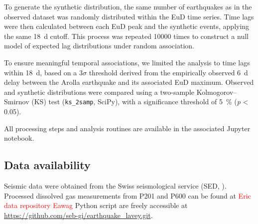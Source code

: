 To generate the synthetic distribution, the same number of earthquakes as in the observed dataset was randomly distributed within the EuD time series.
Time lags were then calculated between each EuD peak and the synthetic events, applying the same \SI{18}{\day} cutoff.
This process was repeated \num{10000} times to construct a null model of expected lag distributions under random association.

To ensure meaningful temporal associations, we limited the analysis to time lags within \SI{18}{\day}, based on a 3$\sigma$ threshold derived from the empirically observed \SI{6}{\day} delay between the Arolla earthquake and its associated EuD maximum.
Observed and synthetic distributions were compared using a two-sample Kolmogorov–Smirnov (KS) test (\texttt{ks\_2samp}, SciPy), with a significance threshold of \SI{5}{\percent} (\textit{p} < 0.05).

All processing steps and analysis routines are available in the associated Jupyter notebook.

\subsection{Data availability}
Seismic data were obtained from the Swiss seismological service (SED, \cite{sed2025earthquakes}).
Processed dissolved gas measurements from P201 and P600 can be found at \textcolor{red}{Eric data repository Eawag}
Python script are freely accessible at \url{https://github.com/seb-gi/earthquake_lavey.git}.